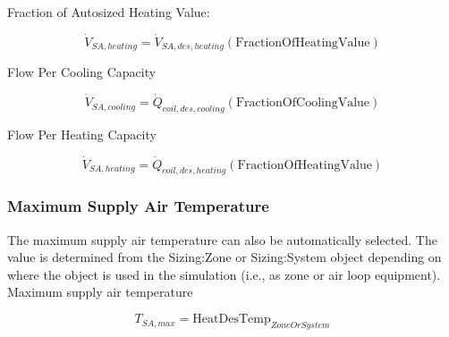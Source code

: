Fraction of Autosized Heating Value:

\begin{equation}
\dot V_{SA,heating} = \dot V_{SA,des,heating}\left(\text{FractionOfHeatingValue}\right)
\end{equation}

Flow Per Cooling Capacity

\begin{equation}
\dot V_{SA,cooling} = \dot Q_{coil,des,cooling}\left(\text{FractionOfCoolingValue}\right)
\end{equation}

Flow Per Heating Capacity

\begin{equation}
\dot V_{SA,heating} = \dot Q_{coil,des,heating}\left(\text{FractionOfHeatingValue}\right)
\end{equation}

\subsubsection{Maximum Supply Air Temperature}\label{maximum-supply-air-temperature}

The maximum supply air temperature can also be automatically selected. The value is determined from the Sizing:Zone or Sizing:System object depending on where the object is used in the simulation (i.e., as zone or air loop equipment). Maximum supply air temperature

\begin{equation}
T_{SA,max} = \text{HeatDesTemp}_{ZoneOrSystem}
\end{equation}
